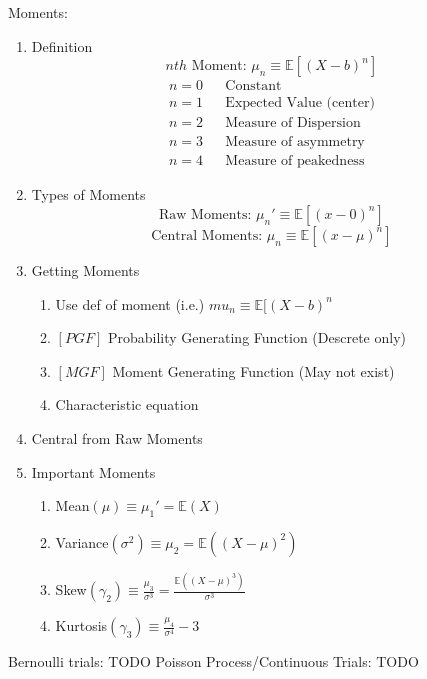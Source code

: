 \documentclass[12pt]{article}
\renewcommand{\=}[1]{\stackrel{#1}{=}} %
\theoremstyle{definition}
\theoremstyle{remark}
\begin{document}
Moments:
\begin{enumerate}
\item Definition 
  \begin{equation}
  nth\textrm{ Moment: }\mu_n \equiv \mathbb{E}[(X-b)^n]
\end{equation}
\begin{align*}
  n = 0& & \textrm{Constant}\\
  n = 1& & \textrm{Expected Value (center)}\\
  n = 2& & \textrm{Measure of Dispersion}\\
  n = 3& & \textrm{Measure of asymmetry}\\
  n = 4& & \textrm{Measure of peakedness}
\end{align*}
\item Types of Moments
  \begin{equation}
    \textrm{Raw Moments: } \mu_n' \equiv \mathbb{E}[(x-0)^n]
  \end{equation}
  \begin{equation}
    \textrm{Central Moments: } \mu_n \equiv \mathbb{E}[(x-\mu)^n]
  \end{equation}
\item Getting Moments
  \begin{enumerate}
  \item Use def of moment (i.e.) $mu_n \equiv \mathbb{E}[(X-b)^n$
  \item $[PGF]$ Probability Generating Function (Descrete only)
  \item $[MGF]$ Moment Generating Function (May not exist)
    
  \item Characteristic equation
  \end{enumerate}
\item Central from Raw Moments
\item Important Moments
  \begin{enumerate}
  \item Mean$(\mu) \equiv \mu_1' = \mathbb{E}(X)$
  \item Variance$(\sigma^2) \equiv \mu_2 = \mathbb{E}((X-\mu)^2)$
  \item Skew$(\gamma_2) \equiv \frac{\mu_3}{\sigma^3} = \frac{\mathbb{E}((X-\mu)^3)}{\sigma^3}$
  \item Kurtosis$(\gamma_3) \equiv \frac{\mu_4}{\sigma^4} -3$
  \end{enumerate}
\end{enumerate}


Bernoulli trials: TODO
Poisson Process/Continuous Trials: TODO
\end{document}
